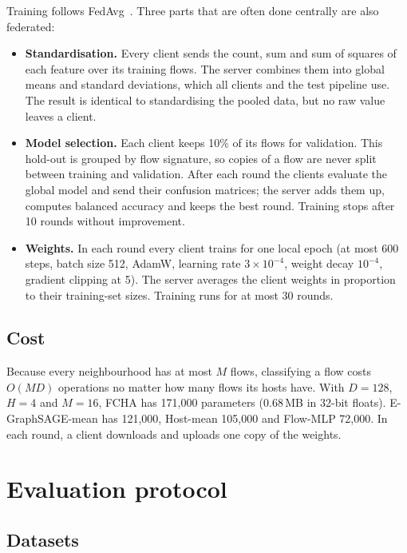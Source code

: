 \documentclass[pdflatex,sn-mathphys-num]{sn-jnl}
\begin{document}
Training follows FedAvg~\cite{mcmahan2017fedavg}. Three parts that are often done centrally are also federated:
\begin{itemize}
\item \textbf{Standardisation.} Every client sends the count, sum and sum of squares of each feature over its training flows. The server combines them into global means and standard deviations, which all clients and the test pipeline use. The result is identical to standardising the pooled data, but no raw value leaves a client.
\item \textbf{Model selection.} Each client keeps 10\% of its flows for validation. This hold-out is grouped by flow signature, so copies of a flow are never split between training and validation. After each round the clients evaluate the global model and send their confusion matrices; the server adds them up, computes balanced accuracy and keeps the best round. Training stops after 10 rounds without improvement.
\item \textbf{Weights.} In each round every client trains for one local epoch (at most 600 steps, batch size 512, AdamW, learning rate $3\times10^{-4}$, weight decay $10^{-4}$, gradient clipping at 5). The server averages the client weights in proportion to their training-set sizes. Training runs for at most 30 rounds.
\end{itemize}

\subsection{Cost}\label{sec:cost}

Because every neighbourhood has at most $M$ flows, classifying a flow costs $O(MD)$ operations no matter how many flows its hosts have. With $D=128$, $H=4$ and $M=16$, FCHA has 171{,}000 parameters (0.68\,MB in 32-bit floats). E-GraphSAGE-mean has 121{,}000, Host-mean 105{,}000 and Flow-MLP 72{,}000. In each round, a client downloads and uploads one copy of the weights.

\section{Evaluation protocol}\label{sec:protocol}

\subsection{Datasets}\label{sec:data}
\end{document}
